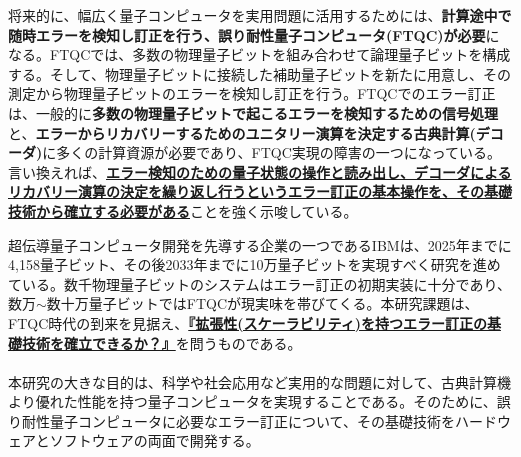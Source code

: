 \documentclass[11pt,a4j,dvipdfmx]{jarticle} 					%
\newcommand{\研究課題名}{誤り耐性量子コンピュータに向けた誤り訂正技術の開発(仮)}
\newcommand{\研究機関名}{東京大学}
\newcommand{\研究代表者氏名}{寺師弘二}
\newcommand{\研究期間の最終元号年度}{10}  %
\newcommand{\mybf}[1]{{\bfseries\sffamily#1}}
\begin{document}
将来的に、幅広く量子コンピュータを実用問題に活用するためには、\mybf{計算途中で随時エラーを検知し訂正を行う、誤り耐性量子コンピュータ(FTQC)が必要}になる。FTQCでは、多数の物理量子ビットを組み合わせて論理量子ビットを構成する。そして、物理量子ビットに接続した補助量子ビットを新たに用意し、その測定から物理量子ビットのエラーを検知し訂正を行う。FTQCでのエラー訂正は、一般的に\mybf{多数の物理量子ビットで起こるエラーを検知するための信号処理}と、\mybf{エラーからリカバリーするためのユニタリー演算を決定する古典計算(デコーダ)}に多くの計算資源が必要であり、FTQC実現の障害の一つになっている。言い換えれば、\mybf{\ul{エラー検知のための量子状態の操作と読み出し、デコーダによるリカバリー演算の決定を繰り返し行うというエラー訂正の基本操作を、その基礎技術から確立する必要がある}}ことを強く示唆している。

超伝導量子コンピュータ開発を先導する企業の一つであるIBMは、2025年までに4,158量子ビット、その後2033年までに10万量子ビットを実現すべく研究を進めている。数千物理量子ビットのシステムはエラー訂正の初期実装に十分であり、数万$\sim$数十万量子ビットではFTQCが現実味を帯びてくる。本研究課題は、FTQC時代の到来を見据え、\mybf{\ul{『拡張性(スケーラビリティ)を持つエラー訂正の基礎技術を確立できるか？』}}を問うものである。\\


\\
本研究の大きな目的は、科学や社会応用など実用的な問題に対して、古典計算機より優れた性能を持つ量子コンピュータを実現することである。そのために、誤り耐性量子コンピュータに必要なエラー訂正について、その基礎技術をハードウェアとソフトウェアの両面で開発する。
\end{document}
